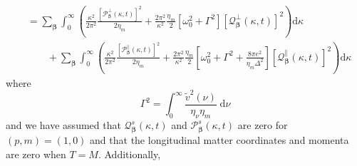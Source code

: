 \documentclass{article}
\begin{document}
\begin{equation}
\begin{split}
&= \sum_{\bm{\beta}}\int_0^\infty\left(\frac{\kappa^2}{2\pi^2}\frac{\left[\mathcal{P}_{\bm{\beta}}^\perp(\kappa,t)\right]^2}{2\eta_m} + \frac{2\pi^2}{\kappa^2}\frac{\eta_m}{2}\left[\omega_0^2 + \Gamma^2\right]\left[\mathcal{Q}_{\bm{\beta}}^\perp(\kappa,t)\right]^2\right)\mathrm{d}\kappa\\
&\qquad + \sum_{\bm{\beta}}\int_0^\infty\left(\frac{\kappa^2}{2\pi^2}\frac{\left[\mathcal{P}_{\bm{\beta}}^\parallel(\kappa,t)\right]^2}{2\eta_m} + \frac{2\pi^2}{\kappa^2}\frac{\eta_m}{2}\left[\omega_0^2 + \Gamma^2 + \frac{8\pi e^2}{\eta_m\Delta^2}\right]\left[\mathcal{Q}_{\bm{\beta}}^\parallel(\kappa,t)\right]^2\right)\mathrm{d}\kappa
\end{split}
\end{equation}
where
\begin{equation}
\Gamma^2 = \int_0^\infty\frac{\tilde{v}^2(\nu)}{\eta_\nu\eta_m}\;\mathrm{d}\nu
\end{equation}
and we have assumed that $\mathcal{Q}_{\bm{\beta}}^s(\kappa,t)$ and $\mathcal{P}_{\bm{\beta}}^s(\kappa,t)$ are zero for $(p,m) = (1,0)$ and that the longitudinal matter coordinates and momenta are zero when $T = M$. Additionally,
\end{document}
